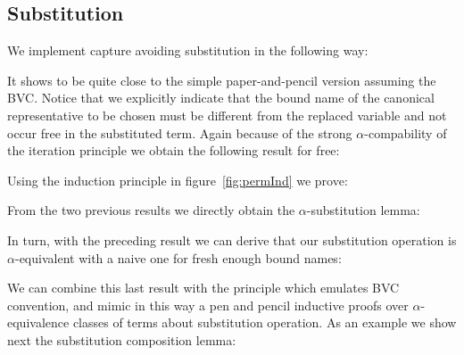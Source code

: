\documentclass{entcs}
\newcommand{\alp}{\ensuremath{\alpha}}
\begin{document}

\subsection{Substitution}
\label{subst}

We implement capture avoiding substitution in the following way:

 \hspace{5px}

It shows to be quite close to the simple paper-and-pencil version assuming the BVC. Notice that we explicitly indicate that the bound name of the canonical representative to be chosen must be different from the replaced variable and not occur free in the substituted term.
Again because of the strong \alp-compability of the iteration principle we obtain the following result for free:

 \hspace{5px}

Using the induction principle in figure~\ref{fig:permInd} we prove:

 \hspace{5px}

From the two previous results we directly obtain the \alp-substitution lemma:

 \hspace{5px}

In turn, with the preceding result we can derive that our substitution operation is \alp-equivalent with a naive one for fresh enough bound names:

 \hspace{5px}

We can combine this last result with the  principle which emulates BVC convention, and mimic in this way a pen and pencil inductive proofs over \alp-equivalence classes of terms about substitution operation. As an example we show next the substitution composition lemma:
\end{document}
